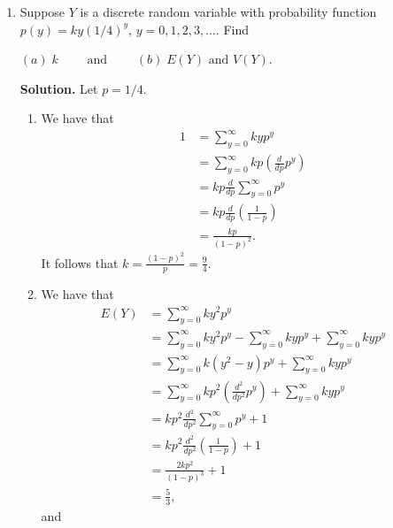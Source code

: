 \documentclass[9pt]{article}
\newcommand{\D}{\displaystyle}
\begin{document}
\begin{enumerate}
   \item Suppose $Y$ is a discrete random variable with probability function
         $p(y) = ky(1/4)^y$, $y = 0, 1, 2, 3, \ldots$. Find

         $(a)\;k \qquad \text{ and } \qquad (b)\;E(Y) \text{ and } V(Y)$.
         
      \textbf{Solution.} Let $p = 1/4$.
      
      \begin{enumerate}
         \item We have that
               \begin{align*}
                  1 &= \sum_{y=0}^\infty kyp^y \\
                    &= \sum_{y=0}^\infty kp\left(\frac{d}{dp}p^y\right) \\
                    &= kp\frac{d}{dp}\sum_{y=0}^\infty p^y \\
                    &= kp\frac{d}{dp}\left(\frac{1}{1 - p}\right) \\
                    &= \frac{kp}{(1 - p)^2}.
               \end{align*}
               It follows that $\D k = \frac{(1 - p)^2}{p} = \frac{9}{4}$.
         \item  We have that
               \begin{align*}
                  E(Y) &= \sum_{y=0}^\infty ky^2p^y \\
                       &= \sum_{y=0}^\infty ky^2p^y - \sum_{y=0}^\infty kyp^y
                          + \sum_{y=0}^\infty kyp^y    \\
                       &= \sum_{y=0}^\infty k(y^2-y)p^y +
                          \sum_{y=0}^\infty kyp^y    \\
                       &= \sum_{y=0}^\infty kp^2\left(\frac{d^2}{dp^2}p^y\right)
                          + \sum_{y=0}^\infty kyp^y \\
                       &= kp^2\frac{d^2}{dp^2}\sum_{y=0}^\infty p^y + 1 \\
                       &= kp^2\frac{d^2}{dp^2}\left(\frac{1}{1 - p}\right) + 1\\
                       &= \frac{2kp^2}{(1-p)^3} + 1 \\
                       &= \frac{5}{3},
               \end{align*}
               and
               \begin{align*}

\end{align*}
\end{enumerate}
\end{enumerate}
\end{document}
